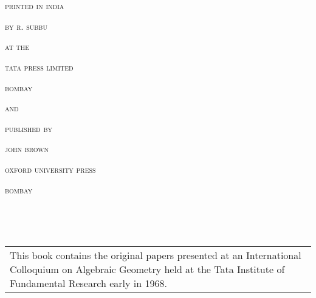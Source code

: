 ~\phantom{a}
\thispagestyle{empty}

\vfill\eject

~\phantom{a}
\thispagestyle{empty}

\vfill

\begin{center}
\textsc{printed in india}

\textsc{by r. subbu}

\textsc{at the}

\textsc{tata press limited}

\textsc{bombay}

\textsc{and}

\textsc{published by}

\textsc{john brown}

\textsc{oxford university press}

\textsc{bombay}
\end{center}

\vfill\eject

~\phantom{a}
\thispagestyle{empty}

\vfill\eject

~\phantom{a}
\thispagestyle{empty}

\vskip 1cm

\begin{center}
\begin{tabular}{p{8cm}}
This book contains the original papers presented at an International Colloquium on Algebraic Geometry held at the Tata Institute of Fundamental Research early in 1968.
\end{tabular}
\end{center}
